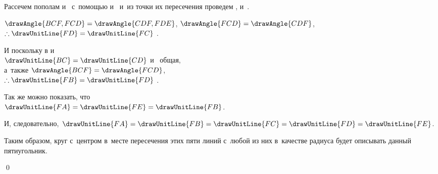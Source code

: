 \documentclass[letters,booklanguage=russian]{byrnebook}
\begin{document}
\begin{center}
Рассечем пополам  и~ с~помощью  и~ и~из точки их пересечения проведем ,  и~.

$\drawAngle{BCF,FCD} = \drawAngle{CDF,FDE}$, $\drawAngle{FCD} = \drawAngle{CDF}$,\\
$\therefore \drawUnitLine{FD} = \drawUnitLine{FC}$ .

И поскольку в
и
\\
$\drawUnitLine{BC} = \drawUnitLine{CD}$ и~ общая,\\
а~также $\drawAngle{BCF} = \drawAngle{FCD}$,\\
$\therefore \drawUnitLine{FB} = \drawUnitLine{FD}$ .

Так же можно показать, что\\
$\drawUnitLine{FA} = \drawUnitLine{FE} = \drawUnitLine{FB}$.

И, следовательно, $\drawUnitLine{FA} = \drawUnitLine{FB} = \drawUnitLine{FC} = \drawUnitLine{FD} = \drawUnitLine{FE}$.
\end{center}

Таким образом, круг с~центром в~месте пересечения этих пяти линий с~любой из них в~качестве радиуса будет описывать данный пятиугольник.

\qed
\end{document}
